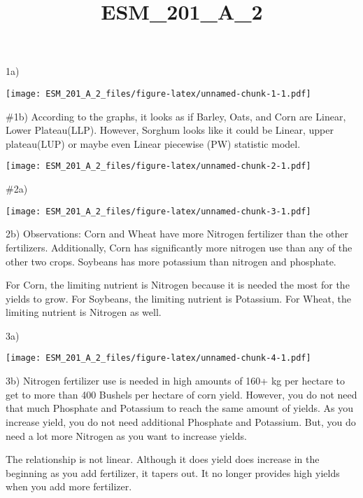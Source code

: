 \documentclass[
]{article}
\title{ESM\_201\_A\_2}
\author{}
\date{\vspace{-2.5em}}
\begin{document}
\maketitle

1a)

\texttt{[image: ESM\_201\_A\_2\_files/figure-latex/unnamed-chunk-1-1.pdf]}

\#1b) According to the graphs, it looks as if Barley, Oats, and Corn are
Linear, Lower Plateau(LLP). However, Sorghum looks like it could be
Linear, upper plateau(LUP) or maybe even Linear piecewise (PW) statistic
model.

\texttt{[image: ESM\_201\_A\_2\_files/figure-latex/unnamed-chunk-2-1.pdf]}

\#2a)

\texttt{[image: ESM\_201\_A\_2\_files/figure-latex/unnamed-chunk-3-1.pdf]}

2b) Observations: Corn and Wheat have more Nitrogen fertilizer than the
other fertilizers. Additionally, Corn has significantly more nitrogen
use than any of the other two crops. Soybeans has more potassium than
nitrogen and phosphate.

For Corn, the limiting nutrient is Nitrogen because it is needed the
most for the yields to grow. For Soybeans, the limiting nutrient is
Potassium. For Wheat, the limiting nutrient is Nitrogen as well.

3a)

\texttt{[image: ESM\_201\_A\_2\_files/figure-latex/unnamed-chunk-4-1.pdf]}

3b) Nitrogen fertilizer use is needed in high amounts of 160+ kg per
hectare to get to more than 400 Bushels per hectare of corn yield.
However, you do not need that much Phosphate and Potassium to reach the
same amount of yields. As you increase yield, you do not need additional
Phosphate and Potassium. But, you do need a lot more Nitrogen as you
want to increase yields.

The relationship is not linear. Although it does yield does increase in
the beginning as you add fertilizer, it tapers out. It no longer
provides high yields when you add more fertilizer.
\end{document}
